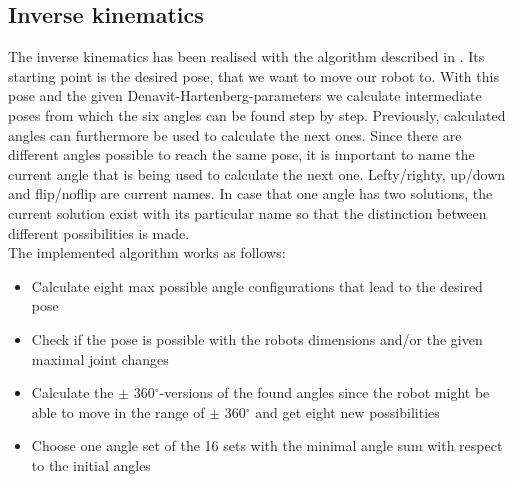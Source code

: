 \subsection{Inverse kinematics}
The inverse kinematics has been realised with the algorithm described in \cite{ref:keating_paper}.
Its starting point is the desired pose, that we want to move our robot to. 
With this pose and the given Denavit-Hartenberg-parameters we calculate intermediate
poses from which the six angles can be found step by step. Previously, calculated angles can furthermore be used to calculate the next ones. Since there are different angles possible to reach the same pose, it is important to name the current angle that is being used to calculate the next one. Lefty/righty, up/down and flip/noflip are current names. In case that one angle has two solutions, the current solution exist with its particular name so
that the distinction between different possibilities is made. \\

The implemented algorithm works as follows:

\begin{itemize}
	\item Calculate eight max possible angle configurations that lead to the desired pose 
	\item Check if the pose is possible with the robots dimensions and/or the given maximal joint changes
	\item Calculate the $\pm$ 360$^\circ$-versions of the found angles since the robot might be able 
	to move in the range of $\pm$ 360$^\circ$ and get eight new possibilities
	\item Choose one angle set of the 16 sets with the minimal angle sum with respect to the initial angles
\end{itemize}
 